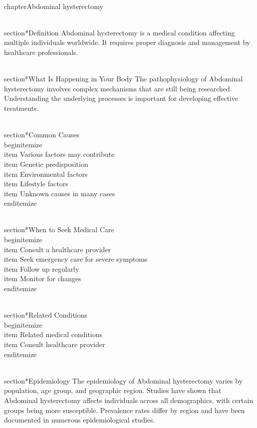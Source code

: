 
\\chapter{Abdominal hysterectomy}

\\section*{Definition}
Abdominal hysterectomy is a medical condition affecting multiple individuals worldwide. It requires proper diagnosis and management by healthcare professionals.

\\section*{What Is Happening in Your Body}
The pathophysiology of Abdominal hysterectomy involves complex mechanisms that are still being researched. Understanding the underlying processes is important for developing effective treatments.

\\section*{Common Causes}
\\begin{itemize}
\\item Various factors may contribute\n  \\item Genetic predisposition\n  \\item Environmental factors\n  \\item Lifestyle factors\n  \\item Unknown causes in many cases
\\end{itemize}

\\section*{When to Seek Medical Care}
\\begin{itemize}
\\item Consult a healthcare provider\n  \\item Seek emergency care for severe symptoms\n  \\item Follow up regularly\n  \\item Monitor for changes
\\end{itemize}

\\section*{Related Conditions}
\\begin{itemize}
\\item Related medical conditions\n  \\item Consult healthcare provider
\\end{itemize}

\\section*{Epidemiology}
The epidemiology of Abdominal hysterectomy varies by population, age group, and geographic region. Studies have shown that Abdominal hysterectomy affects individuals across all demographics, with certain groups being more susceptible. Prevalence rates differ by region and have been documented in numerous epidemiological studies.

